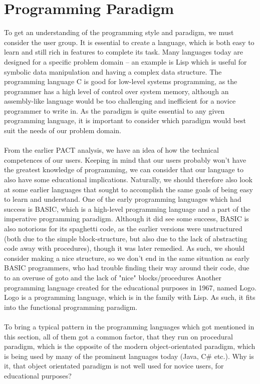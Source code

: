
\section{Programming Paradigm}
\label{programmingparadigm}
To get an understanding of the programming style and paradigm, we must consider the user group. It is essential to create a language, which is both easy to learn and still rich in features to complete its task. Many languages today are designed for a specific problem domain – an example is Lisp which is useful for symbolic data manipulation and having a complex data structure. The programming language C is good for low-level systems programming, as the programmer has a high level of control over system memory, although an assembly-like language would be too challenging and inefficient for a novice programmer to write in.
As the paradigm is quite essential to any given programming language, it is important to consider which paradigm would best suit the needs of our problem domain.\\
\\
From the earlier PACT analysis, we have an idea of how the technical competences of our users. Keeping in mind that our users probably won't have the greatest knowledge of programming, we can consider that our language to also have some educational implications. Naturally, we should therefore also look at some earlier languages that sought to accomplish the same goals of being easy to learn and understand.
One of the early programming languages which had success is BASIC, which is a high-level programming language and a part of the imperative programming paradigm. Although it did see some success, BASIC is also notorious for its spaghetti code, as the earlier versions were unstructured (both due to the simple block-structure, but also due to the lack of abstracting code away with procedures), though it was later remedied. As such, we should consider making a nice structure, so we don't end in the same situation as early BASIC programmers, who had trouble finding their way around their code, due to an overuse of goto and the lack of "nice" blocks/procedures
Another programming language created for the educational purposes in 1967, named Logo. Logo is a programming language, which is in the family with Lisp. As such, it fits into the functional programming paradigm. \cite{scott2000programming} \\
\\
To bring a typical pattern in the programming languages which got mentioned in this section, all of them got a common factor, that they run on procedural paradigm, which is the opposite of the modern object-orientated paradigm, which is being used by many of the prominent languages today (Java, C\# etc.). Why is it, that object orientated paradigm is not well used for novice users, for educational purposes? \\
